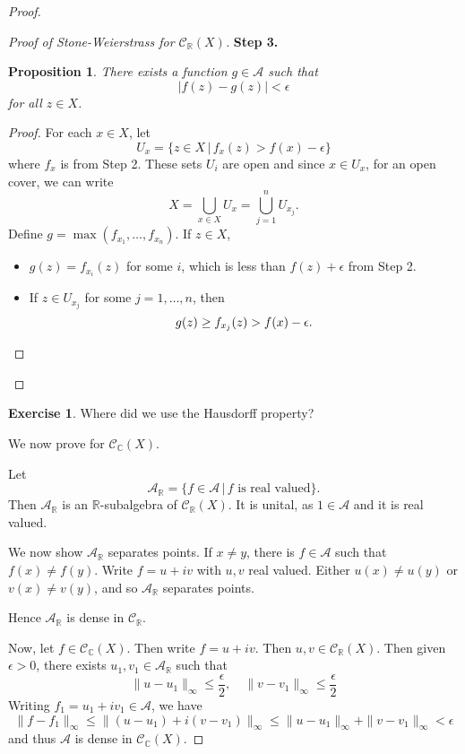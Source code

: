 \documentclass[justified]{tufte-book}
\theoremstyle{plain}%
\newtheorem{prop}[thm]{Proposition}
\theoremstyle{definition}
\newtheorem{exer}[thm]{Exercise}
\theoremstyle{remark}
\newcommand{\given}{ \, | \,}
\newcommand{\R}{\mathbb{R}}
\renewcommand{\C}{\mathbb{C}}
\begin{document}
\begin{proof}
\begin{proof}[Proof of Stone-Weierstrass for $\mathcal{C}_\R(X)$]
      \textbf{Step 3.}  \begin{prop}
          There exists a function $g \in \mathcal{A}$ such that \[
              |f(z) - g(z) | < \epsilon
          \] for all $z \in X$.  
      \end{prop}
      \begin{proof}
          For each $x \in X$, let \[
              U_x = \{ z \in X \, | \, f_x(z) > f(x) - \epsilon \} 
          \] where $f_x$ is from Step 2.  These sets $U_i$ are open and since $x \in U_x$, for an open cover, we can write \[
              X = \bigcup_{x \in X} U_x = \bigcup_{j=1}^n U_{x_j}.
          \]  
          Define $g = \max(f_{x_1}, \dots, f_{x_n})$.  If $z \in X$, 
          \begin{itemize}
              \item $g(z) = f_{x_i}(z)$ for some $i$, which is less than $f(z) + \epsilon$ from Step 2.
              \item If $z \in U_{x_j}$ for some $j = 1, \dots, n$, then \[
                  g(z) \geq f_{x_j}(z) > f(x) - \epsilon.  \qedhere \qedhere 
              \]
          \end{itemize} 
      \end{proof} 
  \end{proof}
  \begin{exer}
      Where did we use the Hausdorff property?
  \end{exer}
  
  We now prove for $\mathcal{C}_\C(X)$.  
  
  Let \[ 
  \mathcal A_\R = \{ f \in \mathcal A \given \text{$f$ is real valued} \}. 
  \]  Then $\mathcal A_\R$ is an $\R$-subalgebra of $\mathcal C_\R(X)$.  It is unital, as $1 \in \mathcal A$ and it is real valued. 
  
  We now show $\mathcal A_\R$ separates points.  If $x \neq y$, there is $f \in \mathcal A$ such that $f(x) \neq f(y)$.  Write $f = u + iv$ with $u,v$ real valued.  Either $u(x) \neq u(y)$ or $v(x) \neq v(y)$, and so $\mathcal A_\R$ separates points.  
  
  Hence $\mathcal A_\R$ is dense in $\mathcal C_\R$.  
  
  Now, let $f \in \mathcal C_\C(X)$.  Then write $f = u + iv$.  Then $u,v \in \mathcal C_\R(X)$.  Then given $\epsilon > 0$, there exists $u_1,v_1 \in \mathcal A_\R$ such that \[
      \| u - u_1 \|_\infty \leq \frac{\epsilon}{2}, \quad \| v - v_1 \|_\infty \leq \frac{\epsilon}{2} 
  \]  Writing $f_1 = u_1 + i v_1 \in \mathcal{A}$, we have \[
      \| f - f_1 \|_\infty \leq \| (u - u_1) + i(v-v_1) \|_\infty \leq \| u - u_1 \|_\infty + \| v - v_1 \|_\infty < \epsilon
  \] and thus $\mathcal{A}$ is dense in $\mathcal C_\C(X)$.
\end{proof}
\end{document}
